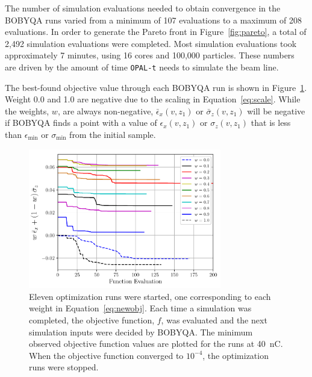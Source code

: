 The number of simulation evaluations needed to obtain convergence
in the BOBYQA runs varied from a minimum of 107 evaluations to a maximum of 208 
evaluations. In order to generate the Pareto front in
Figure~\ref{fig:pareto}, a total of 2,492 simulation evaluations were completed.
Most simulation evaluations took approximately 7 minutes, using 16 cores and 100,000 particles. 
These numbers are driven by the amount of time \verb|OPAL-t| needs to simulate the beam line. 

The best-found objective value through each BOBYQA run is shown in Figure~\ref{fig:iterations}. 
Weight 0.0 and 1.0 are negative due to the scaling in Equation~\ref{eq:scale}. While the weights, $w$, are always non-negative, 
$\bar{\epsilon}_x (v,z_1)$ or $\bar{\sigma}_z(v,z_1)$ will be negative if BOBYQA finds a point with a value of 
$\epsilon_x(v,z_1)$ or $\sigma_z(v,z_1)$ that is less than $\epsilon_{\min}$ or $\sigma_{\min}$ from the initial sample. 
\begin{figure}%
	\begin{center}
		\includegraphics[width=0.75\textwidth]{images/THPAB155f2}
		\caption{\label{fig:iterations}Eleven optimization runs were started, one corresponding to each weight in Equation~\ref{eq:newobj}.
			Each time a simulation was completed, the objective function, $f$, was evaluated and the next simulation inputs were 
			decided by BOBYQA. The minimum observed objective function values are plotted for the runs at \SI{40}{nC}.
			When the objective function converged to $10^{-4}$, the optimization runs were stopped. 
		}
	\end{center}
\end{figure}

